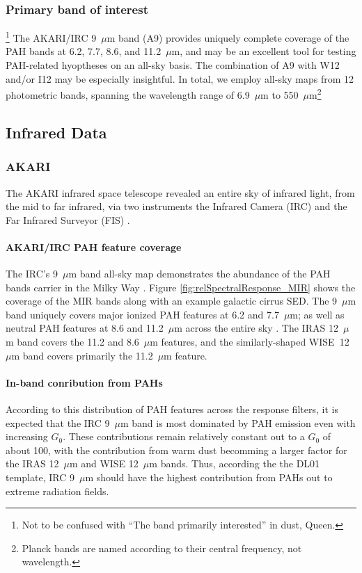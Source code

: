   \subsubsection{Primary band of interest}\footnote{Not to be confused with ``The band primarily interested'' in dust, Queen.}
    The AKARI/IRC 9~$\mu$m band (A9) provides uniquely complete coverage of the PAH bands at 6.2, 7.7, 8.6, and 11.2~$\mu$m, and may be an excellent tool for testing PAH-related hyoptheses on an all-sky basis. The combination of A9 with W12 and/or I12 may be especially insightful. In total, we employ all-sky maps from 12 photometric bands, spanning the wavelength range of 6.9~$\mu$m to 550~$\mu$m\footnote{Planck bands are named according to their central frequency, not wavelength.}

  \subsection{Infrared Data}
    \subsubsection{AKARI}
       The AKARI infrared space telescope revealed an entire sky of infrared light, from the mid to far infrared, via two instruments \citep{akari07} the Infrared Camera (IRC)\citep{irc07} and the Far Infrared Surveyor (FIS) \citep{fis07}.

       \paragraph{AKARI/IRC PAH feature coverage}
         The IRC's 9~$\mu$m band all-sky map demonstrates the abundance of the PAH bands carrier in the Milky Way \citep{ishihara10}. Figure \ref{fig:relSpectralResponse_MIR} shows the coverage of the MIR bands along with an example galactic cirrus SED. The 9~$\mu$m band uniquely covers major ionized PAH features at 6.2 and 7.7~$\mu$m; as well as neutral PAH features at 8.6 and 11.2~$\mu$m across the entire sky \citep{irc07}. The IRAS 12~$\mu$m band covers the 11.2 and 8.6~$\mu$m features, and the similarly-shaped WISE~12~$\mu$m band covers primarily the 11.2~$\mu$m feature.

         \paragraph{In-band conribution from PAHs}
           According to this distribution of PAH features across the response filters, it is expected that the IRC 9~$\mu{}$m band is most dominated by PAH emission even with increasing $G_0$. These contributions remain relatively constant out to a $G_{0}$ of about 100, with the contribution from warm dust becomming a larger factor for the IRAS 12~$\mu$m and WISE 12~$\mu$m bands. Thus, according the the DL01 template, IRC 9~$\mu$m should have the highest contribution from PAHs out to extreme radiation fields.

